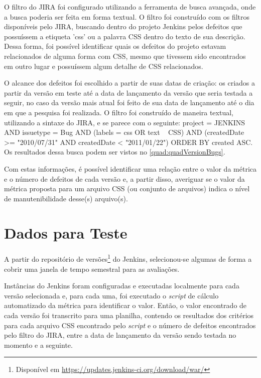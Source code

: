 O filtro do JIRA foi configurado utilizando a ferramenta de busca avançada, onde a busca poderia ser feita em forma textual. O filtro foi construído com os filtros disponíveis pelo JIRA, buscando dentro do projeto Jenkins pelos defeitos que possuíssem a etiqueta 'css' ou a palavra CSS dentro do texto de sua descrição. Dessa forma, foi possível identificar quais os defeitos do projeto estavam relacionados de alguma forma com CSS, mesmo que tivessem sido encontrados em outro lugar e possuíssem algum detalhe de CSS relacionados.

O alcance dos defeitos foi escolhido a partir de suas datas de criação: os criados a partir da versão em teste até a data de lançamento da versão que seria testada a seguir, no caso da versão mais atual foi feito de sua data de lançamento até o dia em que a pesquisa foi realizada. O filtro foi construído de maneira textual, utilizando a sintaxe do JIRA, e se parece com o seguinte: project = JENKINS AND issuetype = Bug AND (labels = css OR text ~ CSS) AND (createdDate >= "2010/07/31" AND createdDate < "2011/01/22") ORDER BY created ASC. Os resultados dessa busca podem ser vistos no \autoref{quad:quadVersionBugs}.

Com estas informações, é possível identificar uma relação entre o valor da métrica e o número de defeitos de cada versão e, a partir disso, averiguar se o valor da métrica proposta para um arquivo CSS (ou conjunto de arquivos) indica o nível de manutenibilidade desse(s) arquivo(s).

\section{Dados para Teste}

A partir do repositório de versões\footnote{Disponível em \url{https://updates.jenkins-ci.org/download/war/}} do Jenkins, selecionou-se algumas de forma a cobrir uma janela de tempo semestral para as avaliações.

Instâncias do Jenkins foram configuradas e executadas localmente para cada versão selecionada e, para cada uma, foi executado o \textit{script} de cálculo automatizado da métrica para identificar o valor. Então, o valor encontrado de cada versão foi transcrito para uma planilha, contendo os resultados dos critérios para cada arquivo CSS encontrado pelo \textit{script} e o número de defeitos encontrados pelo filtro do JIRA, entre a data de lançamento da versão sendo testada no momento e a seguinte.


